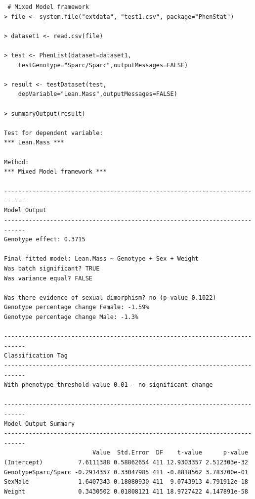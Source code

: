 \documentclass[12pt,a4paper]{article}
\begin{document}
\begingroup
\fontsize{8pt}{12pt}\selectfont
\begin{verbatim}
 # Mixed Model framework
> file <- system.file("extdata", "test1.csv", package="PhenStat") 

> dataset1 <- read.csv(file)

> test <- PhenList(dataset=dataset1,
    testGenotype="Sparc/Sparc",outputMessages=FALSE)
    
> result <- testDataset(test,
    depVariable="Lean.Mass",outputMessages=FALSE)

> summaryOutput(result)

Test for dependent variable:
*** Lean.Mass ***

Method:
*** Mixed Model framework ***

----------------------------------------------------------------------------
Model Output
----------------------------------------------------------------------------
Genotype effect: 0.3715

Final fitted model: Lean.Mass ~ Genotype + Sex + Weight
Was batch significant? TRUE
Was variance equal? FALSE

Was there evidence of sexual dimorphism? no (p-value 0.1022)
Genotype percentage change Female: -1.59%
Genotype percentage change Male: -1.3%

----------------------------------------------------------------------------
Classification Tag
----------------------------------------------------------------------------
With phenotype threshold value 0.01 - no significant change

----------------------------------------------------------------------------
Model Output Summary
----------------------------------------------------------------------------
                         Value  Std.Error  DF    t-value      p-value
(Intercept)          7.6111388 0.58862654 411 12.9303357 2.512303e-32
GenotypeSparc/Sparc -0.2914357 0.33047985 411 -0.8818562 3.783700e-01
SexMale              1.6407343 0.18080930 411  9.0743913 4.791912e-18
Weight               0.3430502 0.01808121 411 18.9727422 4.147891e-58
\end{verbatim}
\endgroup
\end{document}
